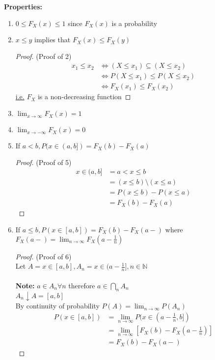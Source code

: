 \documentclass[12pt, twoside]{article}
\begin{document}
\textbf{Properties:}
\begin{enumerate}
	\item{$0 \leq F_X (x) \leq 1$ since $F_X (x)$ is a probability}
	\item{$x \leq y$ implies that $F_X (x) \leq F_X (y)$\\
	\begin{proof}(Proof of 2)\\
	\begin{align*}
		x_1 \leq x_2 & \Longleftrightarrow (X \leq x_1) \subseteq (X \leq x_2)\\
		& \Longleftrightarrow P(X \leq x_1) \leq P(X \leq x_2)\\
		& \Longleftrightarrow F_X (x_1) \leq F_X (x_2)
	\end{align*}
	\underline{i.e.} $F_X$ is a non-decreasing function
\end{proof}}
	\item{$\lim_{x\to\infty} F_X (x) = 1$}
	\item{$\lim_{x\to -\infty} F_X (x) = 0$}
	\item{If $a < b, P(x \in (a,b]) = F_X (b) - F_X (a)$\\
	\begin{proof}
		(Proof of 5)\\
		\begin{align*}
			x \in (a,b] &= a < x \leq b\\
			&= (x \leq b) \setminus (x \leq a)\\
			&= P(x \leq b) - P(x \leq a)\\
			&= F_X (b) - F_X (a)
		\end{align*}

	\end{proof}
}
	\item{
	If $a \leq b, P(x \in [a,b]) = F_X (b) - F_X (a-)$ where $F_X (a-) = \lim_{n\to\infty} F_X (a-\frac{1}{n}) $\\
	\begin{proof} (Proof of 6)\\
		Let $A = x \in [a,b], A_n = x \in (a - \frac{1}{n}], n \in \mathbb{N}$\\
		\\
		\textbf{Note:} $a \in A_n \forall n$ therefore $a \in \bigcap\limits_{n} A_n $\\
		$A_n \downarrow A = [a,b]$\\
		By continuity of probability $P(A) = \lim_{n\to\infty} P(A_n)$
		\begin{align*}
			P(x\in [a,b]) &= \lim_{n\to\infty} P(x\in (a-\frac{1}{n}, b])\\
			&= \lim_{n\to\infty} [F_X (b) - F_X (a-\frac{1}{n})]\\
			&= F_X (b) - F_X (a-)
		\end{align*}
	\end{proof}

}
\end{enumerate}
\end{document}
